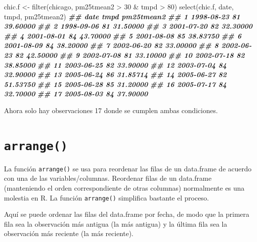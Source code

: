 \documentclass[
]{book}
\newenvironment{Shaded}{\begin{snugshade}}{\end{snugshade}}
\newcommand{\DecValTok}[1]{\textcolor[rgb]{0.00,0.00,0.81}{#1}}
\newcommand{\DocumentationTok}[1]{\textcolor[rgb]{0.56,0.35,0.01}{\textbf{\textit{#1}}}}
\newcommand{\FunctionTok}[1]{\textcolor[rgb]{0.00,0.00,0.00}{#1}}
\newcommand{\NormalTok}[1]{#1}
\newcommand{\OtherTok}[1]{\textcolor[rgb]{0.56,0.35,0.01}{#1}}
\newcommand{\SpecialCharTok}[1]{\textcolor[rgb]{0.00,0.00,0.00}{#1}}
\begin{document}
\begin{Shaded}
\begin{Highlighting}[]
\NormalTok{chic.f }\OtherTok{\textless{}{-}} \FunctionTok{filter}\NormalTok{(chicago, pm25tmean2 }\SpecialCharTok{\textgreater{}} \DecValTok{30} \SpecialCharTok{\&}\NormalTok{ tmpd }\SpecialCharTok{\textgreater{}} \DecValTok{80}\NormalTok{)}
\FunctionTok{select}\NormalTok{(chic.f, date, tmpd, pm25tmean2)}
\DocumentationTok{\#\#          date tmpd pm25tmean2}
\DocumentationTok{\#\# 1  1998{-}08{-}23   81   39.60000}
\DocumentationTok{\#\# 2  1998{-}09{-}06   81   31.50000}
\DocumentationTok{\#\# 3  2001{-}07{-}20   82   32.30000}
\DocumentationTok{\#\# 4  2001{-}08{-}01   84   43.70000}
\DocumentationTok{\#\# 5  2001{-}08{-}08   85   38.83750}
\DocumentationTok{\#\# 6  2001{-}08{-}09   84   38.20000}
\DocumentationTok{\#\# 7  2002{-}06{-}20   82   33.00000}
\DocumentationTok{\#\# 8  2002{-}06{-}23   82   42.50000}
\DocumentationTok{\#\# 9  2002{-}07{-}08   81   33.10000}
\DocumentationTok{\#\# 10 2002{-}07{-}18   82   38.85000}
\DocumentationTok{\#\# 11 2003{-}06{-}25   82   33.90000}
\DocumentationTok{\#\# 12 2003{-}07{-}04   84   32.90000}
\DocumentationTok{\#\# 13 2005{-}06{-}24   86   31.85714}
\DocumentationTok{\#\# 14 2005{-}06{-}27   82   51.53750}
\DocumentationTok{\#\# 15 2005{-}06{-}28   85   31.20000}
\DocumentationTok{\#\# 16 2005{-}07{-}17   84   32.70000}
\DocumentationTok{\#\# 17 2005{-}08{-}03   84   37.90000}
\end{Highlighting}
\end{Shaded}

Ahora solo hay observaciones 17 donde se cumplen ambas condiciones.

\hypertarget{arrange}{%
\section{\texorpdfstring{\texttt{arrange()}}{arrange()}}\label{arrange}}

La función \texttt{arrange()} se usa para reordenar las filas de un data.frame de acuerdo con una de las variables/columnas. Reordenar filas de un data.frame (manteniendo el orden correspondiente de otras columnas) normalmente es una molestia en R. La función \texttt{arrange()} simplifica bastante el proceso.

Aquí se puede ordenar las filas del data.frame por fecha, de modo que la primera fila sea la observación más antigua (la más antigua) y la última fila sea la observación más reciente (la más reciente).
\end{document}
